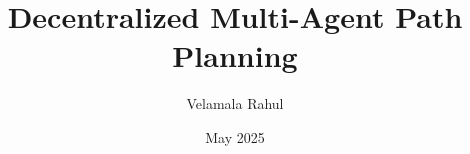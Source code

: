 \documentclass[btech,thesis,twoside]{iist}
\title{Decentralized Multi-Agent Path Planning }
\author{Velamala Rahul}
\date{May 2025}
\begin{document}
\maketitle %
\makecertificate %
\makedeclaration %
\makeacknowledgements %
\makeabstract %
\maketableofcontents %
\makelistoffigures %
\makeabbreviations %

\makechaptersettings 



















\makeindexsettings
\end{document}
